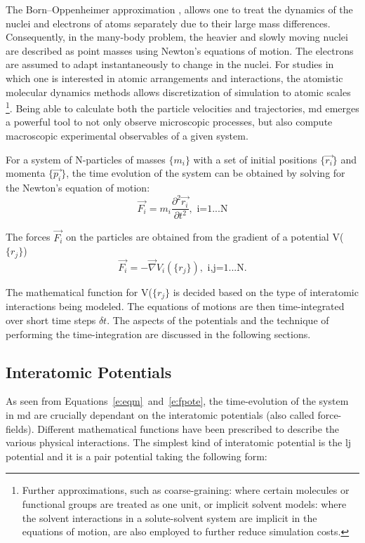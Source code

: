 The Born–Oppenheimer approximation \cite{Born1927}, allows one to treat the dynamics of the nuclei and electrons of atoms separately due to their large mass differences. Consequently, in the many-body problem, the heavier and slowly moving nuclei are described as point masses using Newton's equations of motion. The electrons are assumed to adapt instantaneously to change in the nuclei. For studies in which one is interested in atomic arrangements and interactions, the atomistic molecular dynamics methods allows discretization of simulation to atomic scales \footnote{Further approximations, such as coarse-graining: where certain molecules or functional groups are treated as one unit, or implicit solvent models: where the solvent interactions in a solute-solvent system are implicit in the equations of motion, are also employed to further reduce simulation costs.}. Being able to calculate both the particle velocities and trajectories, \gls{md} emerges a powerful tool to not only observe microscopic processes, but also compute macroscopic experimental observables of a given system. \par

For a system of N-particles of masses $\{m_i\}$ with a set of initial positions $\{ \vec{r_i} \}$ and momenta $\{ \vec{p_i} \}$, the time evolution of the system can be obtained by solving for the Newton's equation of motion:
\begin{equation} \label{e:eqm}
\vec{F_i} = m_i \frac{\partial^2 \vec{r_i}}{\partial t^2}, \text{ i=1...N}
\end{equation}

The forces $\vec{F_i}$ on the particles are obtained from the gradient of a potential V($\{r_j\}$)
 \begin{equation} \label{e:fpote}
\vec{F_i} = -\vec{\nabla} V_i (\{r_j\}), \text{ i,j=1...N}.
\end{equation}

The mathematical function for V($\{r_j\}$ is decided based on the type of interatomic interactions being modeled. The equations of motions are then time-integrated over short time steps $\delta t$. The aspects of the potentials and the technique of performing the time-integration are discussed in the following sections.

\subsection{Interatomic Potentials} \label{s:ffs}
As seen from Equations~\ref{e:eqm}~and~\ref{e:fpote}, the time-evolution of the system in \gls{md} are crucially dependant on the interatomic potentials (also called force-fields). Different mathematical functions have been prescribed to describe the various physical interactions. The simplest kind of interatomic potential is the \gls{lj} potential and it is a pair potential taking the following form:

